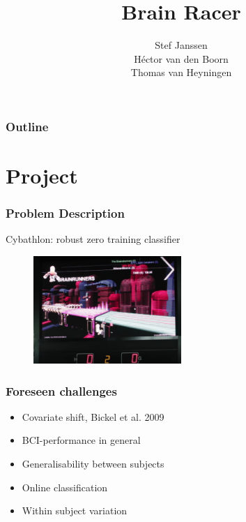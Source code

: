 \documentclass{beamer}
\title[Brain Racer]{
  Brain Racer}
\author[Stef, H\'ector, Thomas]{Stef Janssen\\H\'ector van den Boorn\\Thomas van Heyningen }
\begin{document}
\begin{frame}
  \titlepage
\end{frame}

\begin{frame}
  \frametitle{Outline}
  \tableofcontents
\end{frame}



\section{Project}
\begin{frame}
  \frametitle{Problem Description}

  Cybathlon: robust zero training classifier


  \begin{figure}
   
    \includegraphics[width=0.5\textwidth]{cybathlon_challenge.png}
  \end{figure}
  
\end{frame}

\begin{frame}
  \frametitle{Foreseen challenges}

  \begin{itemize}
    \item Covariate shift, Bickel et al. 2009
    \item BCI-performance in general
    \item Generalisability between subjects
    \item Online classification
    \item Within subject variation
  \end{itemize}
\end{frame}
\end{document}
